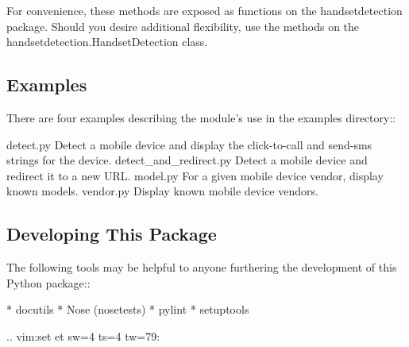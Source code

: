 For convenience, these methods are exposed as functions on the handsetdetection package. Should you desire additional flexibility, use the methods on the handsetdetection.\+Handset\+Detection class.

\subsection*{Examples }

There are four examples describing the module's use in the examples directory\+:\+:

detect.\+py Detect a mobile device and display the click-\/to-\/call and send-\/sms strings for the device. detect\+\_\+and\+\_\+redirect.\+py Detect a mobile device and redirect it to a new U\+R\+L. model.\+py For a given mobile device vendor, display known models. vendor.\+py Display known mobile device vendors.

\subsection*{Developing This Package }

The following tools may be helpful to anyone furthering the development of this Python package\+:\+: \begin{DoxyVerb}* docutils
* Nose (nosetests)
* pylint
* setuptools
\end{DoxyVerb}


.. vim\+:set et sw=4 ts=4 tw=79\+: 
